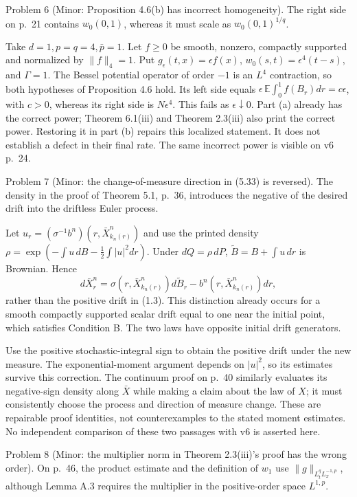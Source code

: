 \documentclass[10pt]{article}
\begin{document}
Problem 6 (Minor: Proposition 4.6(b) has incorrect homogeneity).  The right side on p. 21 contains \(w_0(0,1)\), whereas it must scale as \(w_0(0,1)^{1/q}\).\par
Take \(d=1,p=q=4,\bar p=1\). Let \(f\geq0\) be smooth, nonzero, compactly supported and normalized by \(\|f\|_4=1\). Put \(g_\epsilon(t,x)=\epsilon f(x)\), \(w_0(s,t)=\epsilon^4(t-s)\), and \(\Gamma=1\). The Bessel potential operator of order \(-1\) is an \(L^4\) contraction, so both hypotheses of Proposition 4.6 hold. Its left side equals \(\epsilon\,\mathbb E\int_0^1 f(B_r)dr=c\epsilon\), with \(c>0\), whereas its right side is \(N\epsilon^4\). This fails as \(\epsilon\downarrow0\). Part (a) already has the correct power; Theorem 6.1(iii) and Theorem 2.3(iii) also print the correct power. Restoring it in part (b) repairs this localized statement. It does not establish a defect in their final rate. The same incorrect power is visible on v6 p. 24.\par
Problem 7 (Minor: the change-of-measure direction in (5.33) is reversed).  The density in the proof of Theorem 5.1, p. 36, introduces the negative of the desired drift into the driftless Euler process.\par
Let \(u_r=(\sigma^{-1}b^n)(r,\bar X_{k_n(r)}^n)\) and use the printed density \(\rho=\exp(-\int u\,dB-\frac12\int|u|^2dr)\). Under \(dQ=\rho\,dP\), \(\widetilde B=B+\int u\,dr\) is Brownian. Hence \[d\bar X_r^n
=\sigma(r,\bar X_{k_n(r)}^n)d\widetilde B_r
-b^n(r,\bar X_{k_n(r)}^n)dr,\] rather than the positive drift in (1.3). This distinction already occurs for a smooth compactly supported scalar drift equal to one near the initial point, which satisfies Condition B. The two laws have opposite initial drift generators.\par
Use the positive stochastic-integral sign to obtain the positive drift under the new measure. The exponential-moment argument depends on \(|u|^2\), so its estimates survive this correction. The continuum proof on p. 40 similarly evaluates its negative-sign density along \(\bar X\) while making a claim about the law of \(X\); it must consistently choose the process and direction of measure change. These are repairable proof identities, not counterexamples to the stated moment estimates. No independent comparison of these two passages with v6 is asserted here.\par
Problem 8 (Minor: the multiplier norm in Theorem 2.3(iii)’s proof has the wrong order).  On p. 46, the product estimate and the definition of \(w_1\) use \(\|g\|_{L^q_tL^{-1,p}_x}\), although Lemma A.3 requires the multiplier in the positive-order space \(L^{1,p}\).\par
\end{document}

